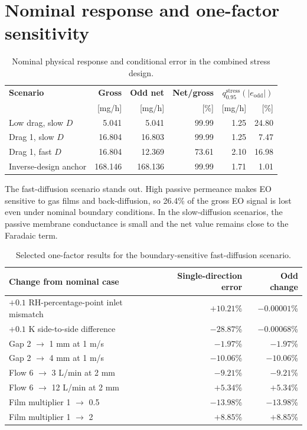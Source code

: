 \documentclass[10pt,a4paper]{article}
\begin{document}
\section{Nominal response and one-factor sensitivity}

\begin{table}[H]
\centering
\caption{Nominal physical response and conditional error in the combined stress design.}
\begin{tabularx}{\textwidth}{@{}Yrrrrr@{}}
\toprule
\textbf{Scenario} & \textbf{Gross} & \textbf{Odd net} & \textbf{Net/gross} &  \\
 & [mg/h] & [mg/h] & [\%] & [mg/h] & [\%] \\
\midrule
Low drag, slow $D$ & 5.041 & 5.041 & 99.99 & 1.25 & 24.80 \\
Drag 1, slow $D$ & 16.804 & 16.803 & 99.99 & 1.25 & 7.47 \\
Drag 1, fast $D$ & 16.804 & 12.369 & 73.61 & 2.10 & 16.98 \\
Inverse-design anchor & 168.146 & 168.136 & 99.99 & 1.71 & 1.01 \\
\bottomrule
\end{tabularx}
\end{table}

The fast-diffusion scenario stands out. High passive permeance makes EO
sensitive to gas films and back-diffusion, so 26.4\% of the gross EO signal is
lost even under nominal boundary conditions. In the slow-diffusion scenarios,
the passive membrane conductance is small and the net value remains close to
the Faradaic term.

\begin{table}[H]
\centering
\caption{Selected one-factor results for the boundary-sensitive fast-diffusion scenario.}
\begin{tabularx}{\textwidth}{@{}Yrr@{}}
\toprule
\textbf{Change from nominal case} & \textbf{Single-direction error} & \textbf{Odd change} \\
\midrule
$+0.1$ RH-percentage-point inlet mismatch & $+10.21$\% & $-0.00001$\% \\
$+0.1$ K side-to-side difference & $-28.87$\% & $-0.00068$\% \\
Gap 2 $\rightarrow$ 1 mm at 1 m/s & $-1.97$\% & $-1.97$\% \\
Gap 2 $\rightarrow$ 4 mm at 1 m/s & $-10.06$\% & $-10.06$\% \\
Flow 6 $\rightarrow$ 3 L/min at 2 mm & $-9.21$\% & $-9.21$\% \\
Flow 6 $\rightarrow$ 12 L/min at 2 mm & $+5.34$\% & $+5.34$\% \\
Film multiplier 1 $\rightarrow$ 0.5 & $-13.98$\% & $-13.98$\% \\
Film multiplier 1 $\rightarrow$ 2 & $+8.85$\% & $+8.85$\% \\
\bottomrule
\end{tabularx}
\end{table}
\end{document}
